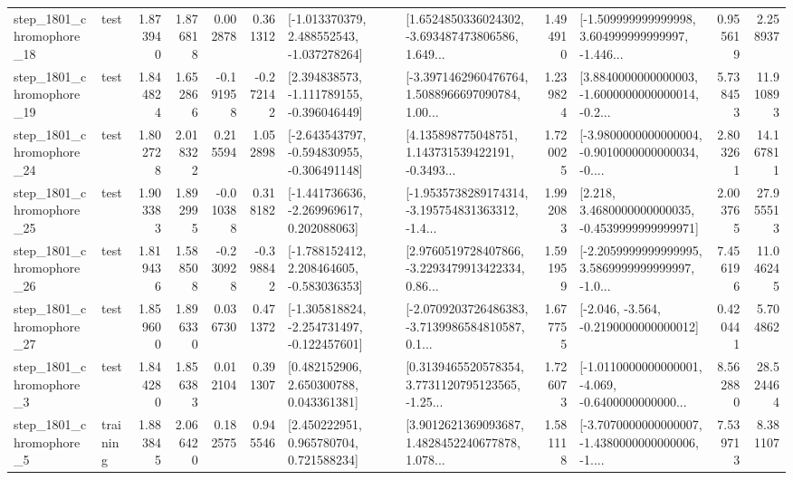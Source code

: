 \begin{tabular}{llrrrrllrlrr}
 step\_1801\_chromophore\_18 &      test &      1.873940 &    1.876818 &      0.002878 &  0.361312 &   [-1.013370379, 2.488552543, -1.037278264] &  [1.6524850336024302, -3.693487473806586, 1.649... &       1.494910 &  [-1.509999999999998, 3.604999999999997, -1.446... &            0.955619 &          2.258937 \\
 step\_1801\_chromophore\_19 &      test &      1.844824 &    1.652866 &     -0.191958 & -0.272142 &   [2.394838573, -1.111789155, -0.396046449] &  [-3.3971462960476764, 1.5088966697090784, 1.00... &       1.239824 &  [3.8840000000000003, -1.6000000000000014, -0.2... &            5.738453 &         11.910893 \\
 step\_1801\_chromophore\_24 &      test &      1.802728 &    2.018322 &      0.215594 &  1.052898 &  [-2.643543797, -0.594830955, -0.306491148] &  [4.135898775048751, 1.143731539422191, -0.3493... &       1.720025 &  [-3.9800000000000004, -0.9010000000000034, -0.... &            2.803261 &         14.167811 \\
 step\_1801\_chromophore\_25 &      test &      1.903383 &    1.892995 &     -0.010388 &  0.318182 &   [-1.441736636, -2.269969617, 0.202088063] &  [-1.9535738289174314, -3.195754831363312, -1.4... &       1.992083 &   [2.218, 3.4680000000000035, -0.4539999999999971] &            2.003765 &         27.955513 \\
 step\_1801\_chromophore\_26 &      test &      1.819436 &    1.588508 &     -0.230928 & -0.398842 &   [-1.788152412, 2.208464605, -0.583036353] &  [2.9760519728407866, -3.2293479913422334, 0.86... &       1.591959 &  [-2.2059999999999995, 3.5869999999999997, -1.0... &            7.456196 &         11.046245 \\
 step\_1801\_chromophore\_27 &      test &      1.859600 &    1.896330 &      0.036730 &  0.471372 &  [-1.305818824, -2.254731497, -0.122457601] &  [-2.0709203726486383, -3.7139986584810587, 0.1... &       1.677755 &              [-2.046, -3.564, -0.2190000000000012] &            0.420441 &          5.704862 \\
  step\_1801\_chromophore\_3 &      test &      1.844280 &    1.856383 &      0.012104 &  0.391307 &     [0.482152906, 2.650300788, 0.043361381] &  [0.3139465520578354, 3.7731120795123565, -1.25... &       1.726073 &  [-1.0110000000000001, -4.069, -0.6400000000000... &            8.562880 &         28.524464 \\
  step\_1801\_chromophore\_5 &  training &      1.883845 &    2.066420 &      0.182575 &  0.945546 &     [2.450222951, 0.965780704, 0.721588234] &  [3.9012621369093687, 1.4828452240677878, 1.078... &       1.581118 &  [-3.7070000000000007, -1.4380000000000006, -1.... &            7.539713 &          8.381107 \\

\end{tabular}
